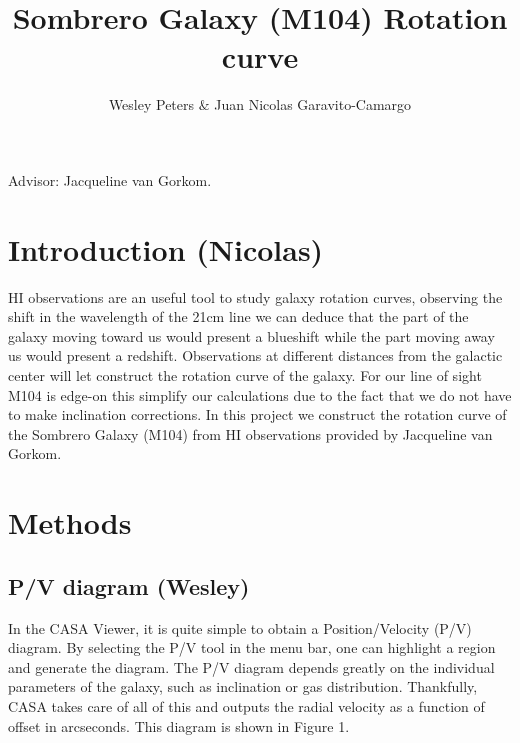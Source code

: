 \documentclass[12pt]{article}
\title{Sombrero Galaxy (M104) Rotation curve }
\begin{document}
\maketitle

\author{Wesley Peters $\&$ Juan Nicolas Garavito-Camargo}

Advisor: Jacqueline van Gorkom.

\section{Introduction (Nicolas)}

HI observations are an useful tool to study galaxy rotation curves, observing 
the shift in the wavelength of the 21cm line we can deduce that the part of the 
galaxy moving toward us would present a blueshift while the part moving away us 
would present a redshift. Observations
at different distances from the galactic center will let construct the rotation 
curve of the galaxy. For our line of sight M104 is edge-on this simplify our calculations
due to the fact that we do not have to make inclination corrections.
In this project we construct the rotation curve of the Sombrero
Galaxy (M104) from HI observations provided by Jacqueline van Gorkom.

\section{Methods}

\subsection{P/V diagram (Wesley)}

In the CASA Viewer, it is quite simple to obtain a Position/Velocity (P/V)
diagram. By selecting the P/V tool in the menu bar, one can highlight
a region and generate the diagram. The P/V diagram depends greatly on
the individual parameters of the galaxy, such as inclination or gas
distribution. Thankfully, CASA takes care of all of this and outputs
the radial velocity as a function of offset in arcseconds. This
diagram is shown in Figure 1. 
\end{document}
